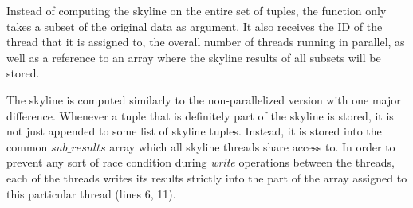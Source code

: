 Instead of computing the skyline on the entire set of tuples, the function only takes a subset of the original data as argument. It also receives the ID of the thread that it is assigned to, the overall number of threads running in parallel, as well as a reference to an array where the skyline results of all subsets will be stored. 

The skyline is computed similarly to the non-parallelized version with one major difference. Whenever a tuple that is definitely part of the skyline is stored, it is not just appended to some list of skyline tuples. Instead, it is stored into the common $sub\_results$ array which all skyline threads share access to. In order to prevent any sort of race condition during \textit{write} operations between the threads, each of the threads writes its results strictly into the part of the array assigned to this particular thread (lines 6, 11). %







